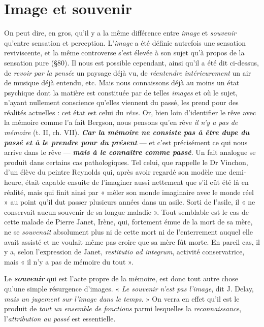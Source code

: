 \section{Image et souvenir}%
On peut dire, en gros, qu’il y a la
même différence entre {\it image} et {\it souvenir} qu’entre sensation et perception.
L'{\it image} a été définie autrefois une sensation reviviscente, et
la même controverse s’est élevée à son sujet qu’à propos de la sensation
pure (\S 80). Il nous est possible cependant, ainsi qu’il a été dit
ci-dessus, de {\it revoir par la pensée} un paysage déjà vu, de {\it réentendre
intérieurement} un air de musique déjà entendu, etc. Mais nous connaissons
déjà au moins un état psychique dont la matière est constituée
par de telles {\it images} et où le sujet, n’ayant nullement conscience
qu’elles viennent du passé, les prend pour des réalités actuelles : cet
état est celui du {\it rêve}. Or, bien loin d’identifier le rêve avec la mémoire
comme l’a fait Bergson, nous pensons qu’en rêve {\it il n’y a pas de mémoire}
(t. II, ch. VII). \textbf{\textit {Car la mémoire ne consiste pas à être dupe du passé
et à le prendre pour du présent}} — et c’est précisément ce qui nous
arrive dans le rêve — \textbf{\textit {mais à le connaître comme passé}}. Un fait
analogue se produit dans certains cas pathologiques. Tel celui, que
rappelle le Dr Vinchon, d’un élève du peintre Reynolds qui, après
avoir regardé son modèle une demi-heure, était capable ensuite
de l’imaginer aussi nettement que s’il eût été là en réalité, mais
qui finit ainsi par « mêler son monde imaginaire avec le monde réel »
au point qu’il dut passer plusieurs années dans un asile. Sorti de
l’asile, il « ne conservait aucun souvenir de sa longue maladie ».
Tout semblable est le cas de cette malade de Pierre Janet, Irène,
qui, fortement émue de la mort de sa mère, ne se {\it souvenait} absolument
plus ni de cette mort ni de l’enterrement auquel elle avait assisté et
ne voulait même pas croire que sa mère fût morte. En pareil cas,
il y a, selon l’expression de Janet, {\it restitutio ad integrum}, activité
conservatrice, mais « il n’y a pas de mémoire du tout ».

Le \textbf{\textit {souvenir}} qui est l’acte propre de la mémoire, est donc tout
autre chose qu’une simple résurgence d’images. « {\it Le souvenir n’est
pas l’image}, dit J. Delay, {\it mais un jugement sur l’image dans le
temps}. » On verra en effet qu’il est le produit de {\it tout un ensemble de
fonctions} parmi lesquelles la {\it reconnaissance}, l'{\it attribution au passé} est
essentielle.

